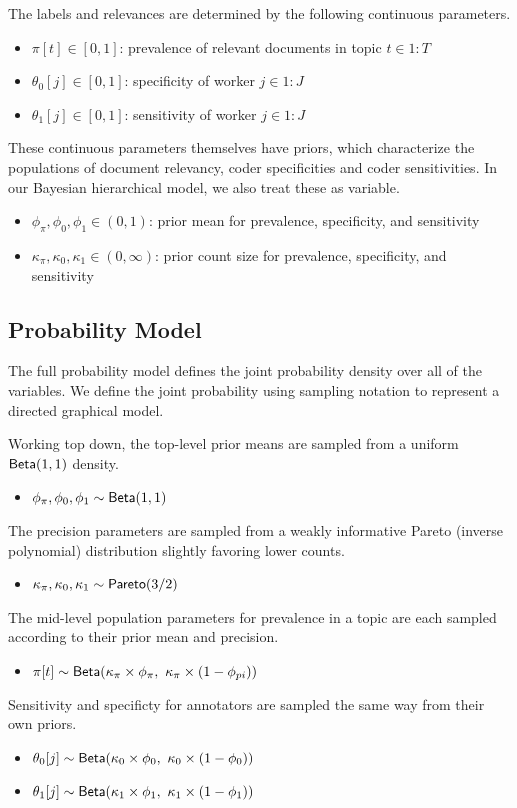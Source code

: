 \documentclass{article}
\begin{document}
The labels and relevances are determined by the following continuous parameters.
%
\begin{itemize}
\item $\pi[t] \in [0,1]$: prevalence of relevant documents in topic $t \in
1{:}T$
\item $\theta_0[j] \in [0,1]$: specificity of worker $j \in 1{:}J$
\item $\theta_1[j] \in [0,1]$: sensitivity of worker $j \in 1{:}J$
\end{itemize}
%
These continuous parameters themselves have priors, which characterize
the populations of document relevancy, coder specificities and coder
sensitivities.  In our Bayesian hierarchical model, we also treat
these as variable.
%
\begin{itemize}
\item $\phi_{\pi}, \phi_0, \phi_1  \in (0,1)$: prior mean for
prevalence, specificity, and sensitivity
\item $\kappa_{\pi}, \kappa_0, \kappa_1 \in (0,\infty)$: prior count
size for prevalence, specificity, and sensitivity
\end{itemize}
%


\subsection{Probability Model}

The full probability model defines the joint probability density over
all of the variables.  We define the joint probability using sampling
notation to represent a directed graphical model.  

Working top down, the top-level prior means are sampled from
a uniform $\mbox{\sf Beta}(1,1)$ density.
%
\begin{itemize}
\item $\phi_{\pi}, \phi_0, \phi_1 \sim \mbox{\sf Beta}(1,1)$
\end{itemize}
%
The precision parameters are sampled from a weakly informative Pareto
(inverse polynomial) distribution slightly favoring lower counts.
%
\begin{itemize}
\item $\kappa_{\pi}, \kappa_0, \kappa_1 \sim \mbox{\sf Pareto}(3/2)$
\end{itemize}
%

The mid-level population parameters for prevalence in a topic are
each sampled according to their prior mean and precision.
%
\begin{itemize}
\item $\pi[t] \sim \mbox{\sf Beta}(\kappa_{\pi} \times \phi_{\pi}, \
\kappa_{\pi} \times (1 - \phi_{pi}))$
\end{itemize}
%
Sensitivity and specificty for annotators are sampled the same way
from their own priors.
%
\begin{itemize}
\item $\theta_0[j] \sim \mbox{\sf Beta}(\kappa_0 \times \phi_0, 
\ \kappa_0 \times  (1 - \phi_0))$
\item $\theta_1[j] \sim \mbox{\sf Beta}(\kappa_1 \times \phi_1, 
\ \kappa_1 \times  (1 - \phi_1))$
\end{itemize}
%
\end{document}
